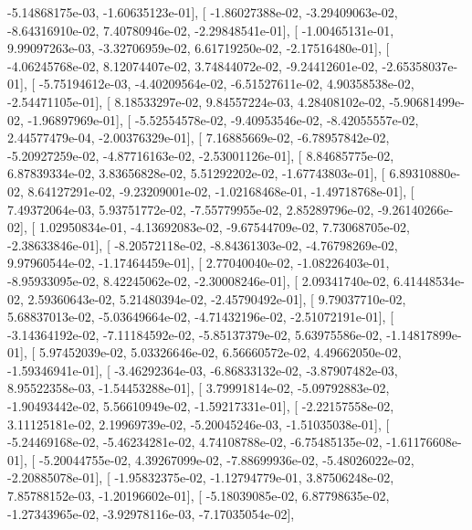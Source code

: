 \documentclass{article}
\begin{document}
         -5.14868175e-03,  -1.60635123e-01],
       [ -1.86027388e-02,  -3.29409063e-02,  -8.64316910e-02,
          7.40780946e-02,  -2.29848541e-01],
       [ -1.00465131e-01,   9.99097263e-03,  -3.32706959e-02,
          6.61719250e-02,  -2.17516480e-01],
       [ -4.06245768e-02,   8.12074407e-02,   3.74844072e-02,
         -9.24412601e-02,  -2.65358037e-01],
       [ -5.75194612e-03,  -4.40209564e-02,  -6.51527611e-02,
          4.90358538e-02,  -2.54471105e-01],
       [  8.18533297e-02,   9.84557224e-03,   4.28408102e-02,
         -5.90681499e-02,  -1.96897969e-01],
       [ -5.52554578e-02,  -9.40953546e-02,  -8.42055557e-02,
          2.44577479e-04,  -2.00376329e-01],
       [  7.16885669e-02,  -6.78957842e-02,  -5.20927259e-02,
         -4.87716163e-02,  -2.53001126e-01],
       [  8.84685775e-02,   6.87839334e-02,   3.83656828e-02,
          5.51292202e-02,  -1.67743803e-01],
       [  6.89310880e-02,   8.64127291e-02,  -9.23209001e-02,
         -1.02168468e-01,  -1.49718768e-01],
       [  7.49372064e-03,   5.93751772e-02,  -7.55779955e-02,
          2.85289796e-02,  -9.26140266e-02],
       [  1.02950834e-01,  -4.13692083e-02,  -9.67544709e-02,
          7.73068705e-02,  -2.38633846e-01],
       [ -8.20572118e-02,  -8.84361303e-02,  -4.76798269e-02,
          9.97960544e-02,  -1.17464459e-01],
       [  2.77040040e-02,  -1.08226403e-01,  -8.95933095e-02,
          8.42245062e-02,  -2.30008246e-01],
       [  2.09341740e-02,   6.41448534e-02,   2.59360643e-02,
          5.21480394e-02,  -2.45790492e-01],
       [  9.79037710e-02,   5.68837013e-02,  -5.03649664e-02,
         -4.71432196e-02,  -2.51072191e-01],
       [ -3.14364192e-02,  -7.11184592e-02,  -5.85137379e-02,
          5.63975586e-02,  -1.14817899e-01],
       [  5.97452039e-02,   5.03326646e-02,   6.56660572e-02,
          4.49662050e-02,  -1.59346941e-01],
       [ -3.46292364e-03,  -6.86833132e-02,  -3.87907482e-03,
          8.95522358e-03,  -1.54453288e-01],
       [  3.79991814e-02,  -5.09792883e-02,  -1.90493442e-02,
          5.56610949e-02,  -1.59217331e-01],
       [ -2.22157558e-02,   3.11125181e-02,   2.19969739e-02,
         -5.20045246e-03,  -1.51035038e-01],
       [ -5.24469168e-02,  -5.46234281e-02,   4.74108788e-02,
         -6.75485135e-02,  -1.61176608e-01],
       [ -5.20044755e-02,   4.39267099e-02,  -7.88699936e-02,
         -5.48026022e-02,  -2.20885078e-01],
       [ -1.95832375e-02,  -1.12794779e-01,   3.87506248e-02,
          7.85788152e-03,  -1.20196602e-01],
       [ -5.18039085e-02,   6.87798635e-02,  -1.27343965e-02,
         -3.92978116e-03,  -7.17035054e-02],
\end{document}
